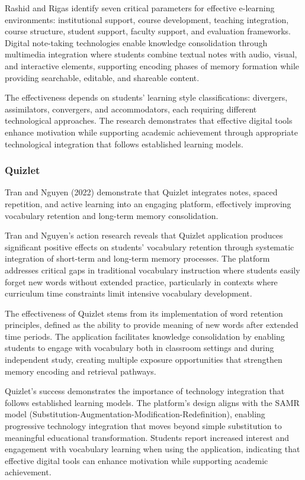 {\color{maroon}
Rashid and Rigas identify seven critical parameters for effective e-learning environments: institutional support, course development, teaching integration, course structure, student support, faculty support, and evaluation frameworks. Digital note-taking technologies enable knowledge consolidation through multimedia integration where students combine textual notes with audio, visual, and interactive elements, supporting encoding phases of memory formation while providing searchable, editable, and shareable content.

The effectiveness depends on students' learning style classifications: divergers, assimilators, convergers, and accommodators, each requiring different technological approaches. The research demonstrates that effective digital tools enhance motivation while supporting academic achievement through appropriate technological integration that follows established learning models.
}


\subsubsection{Quizlet}

Tran and Nguyen (2022) demonstrate that Quizlet integrates notes, spaced repetition, and active learning into an engaging platform, effectively improving vocabulary retention and long-term memory consolidation.

{\color{maroon}
Tran and Nguyen's action research reveals that Quizlet application produces significant positive effects on students' vocabulary retention through systematic integration of short-term and long-term memory processes. The platform addresses critical gaps in traditional vocabulary instruction where students easily forget new words without extended practice, particularly in contexts where curriculum time constraints limit intensive vocabulary development.

The effectiveness of Quizlet stems from its implementation of word retention principles, defined as the ability to provide meaning of new words after extended time periods. The application facilitates knowledge consolidation by enabling students to engage with vocabulary both in classroom settings and during independent study, creating multiple exposure opportunities that strengthen memory encoding and retrieval pathways.

Quizlet's success demonstrates the importance of technology integration that follows established learning models. The platform's design aligns with the SAMR model (Substitution-Augmentation-Modification-Redefinition), enabling progressive technology integration that moves beyond simple substitution to meaningful educational transformation. Students report increased interest and engagement with vocabulary learning when using the application, indicating that effective digital tools can enhance motivation while supporting academic achievement.

}



